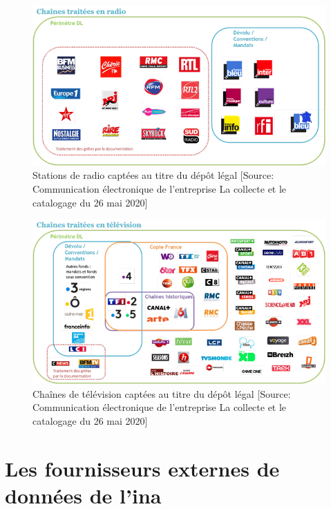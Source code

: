 \begin{figure}[!h]
	\centering
	\includegraphics[width=16cm]{images/dl_radio.png}
	\caption[Stations de radio captées au titre du dépôt légal]{Stations de radio captées au titre du dépôt légal [Source: Communication électronique  de l'entreprise \og La collecte et le catalogage\fg{} du 26 mai 2020]}
	\label{dl_radio}
\end{figure}

\begin{figure}[!h]
	\centering
	\includegraphics[width=16cm]{images/dl_tv.png}
	\caption[Chaînes de télévision captées au titre du dépôt légal]{Chaînes de télévision captées au titre du dépôt légal [Source: Communication électronique  de l'entreprise \og La collecte et le catalogage\fg{} du 26 mai 2020]}
	\label{dl_tv}
\end{figure}

\chapter{\label{annexe_fournisseurs_exterieurs}Les fournisseurs externes de données de l'\ac{ina}}

